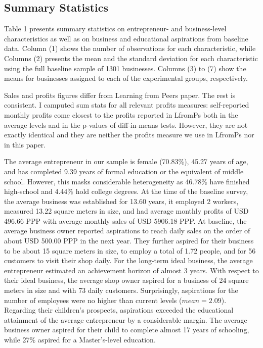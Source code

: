\documentclass[11.5pt]{article}
\begin{document}
\subsection{Summary Statistics}

Table 1 presents summary statistics on entrepreneur- and business-level characteristics as well as on business and educational aspirations from baseline data. Column (1) shows the number of observations for each characteristic, while Columns (2) presents the mean and the standard deviation for each characteristic using the full baseline sample of 1301 businesses. Columns (3) to (7) show the means for businesses assigned to each of the experimental groups, respectively.

\textcolor[rgb]{1.00,0.00,0.00}{Sales and profits figures differ from Learning from Peers paper. The rest is consistent. I camputed sum stats for all relevant profits measures: self-reported monthly profits come closest to the profits reported in LfromPs both in the average levels and in the p-values of diff-in-means tests. However, they are not exactly identical and they are neither the profits measure we use in LfromPs nor in this paper.}

The average entrepreneur in our sample is female (70.83\%), 45.27 years of age, and has completed 9.39 years of formal education or the equivalent of middle school. However, this masks considerable heterogeneity as 46.78\% have finished high-school and 4.44\% hold college degrees. At the time of the baseline survey, the average business was established for 13.60 years, it employed 2 workers, measured 13.22 square meters in size, and had average monthly profits of USD 496.66 PPP with average monthly sales of USD 5906.18 PPP. At baseline, the average business owner reported aspirations to reach daily sales on the order of about USD 500.00 PPP in the next year. They further aspired for their business to be about 15 square meters in size, to employ a total of 1.72 people, and for 56 customers to visit their shop daily. For the long-term ideal business, the average entrepreneur estimated an achievement horizon of almost 3 years. With respect to their ideal business, the average shop owner aspired for a business of 24 square meters in size and with 73 daily customers. Surprisingly, aspirations for the number of employees were no higher than current levels ($mean = 2.09$). Regarding their children's prospects, aspirations exceeded the educational attainment of the average entrepreneur by a considerable margin. The average business owner aspired for their child to complete almost 17 years of schooling, while 27\% aspired for a Master's-level education.
\end{document}
